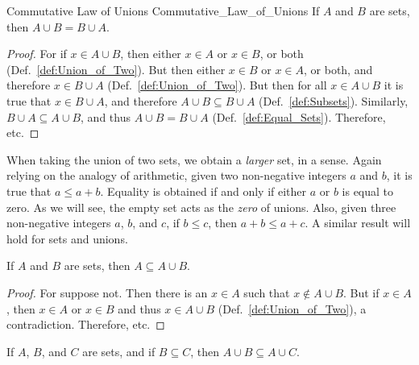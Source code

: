 \documentclass[crop=false,class=book,oneside]{standalone}
\begin{document}
            \begin{ltheorem}{Commutative Law of Unions}
                  {Commutative_Law_of_Unions}
                If $A$ and $B$ are sets, then
                $A\cup{B}=B\cup{A}$.
            \end{ltheorem}
            \begin{proof}
                For if $x\in{A}\cup{B}$, then either $x\in{A}$
                or $x\in{B}$, or both
                (Def.~\ref{def:Union_of_Two}). But then either
                $x\in{B}$ or $x\in{A}$, or both, and therefore
                $x\in{B}\cup{A}$ (Def.~\ref{def:Union_of_Two}).
                But then for all $x\in{A}\cup{B}$ it is true that
                $x\in{B}\cup{A}$, and therefore
                $A\cup{B}\subseteq{B}\cup{A}$
                (Def.~\ref{def:Subsets}). Similarly,
                $B\cup{A}\subseteq{A}\cup{B}$, and thus
                $A\cup{B}=B\cup{A}$ (Def.~\ref{def:Equal_Sets}).
                Therefore, etc.
            \end{proof}
            When taking the union of two sets, we obtain a
            \textit{larger} set, in a sense. Again relying on
            the analogy of arithmetic, given two non-negative
            integers $a$ and $b$, it is true that $a\leq{a}+b$.
            Equality is obtained if and only if either $a$ or
            $b$ is equal to zero. As we will see, the empty set
            acts as the \textit{zero} of unions. Also, given
            three non-negative integers $a$, $b$, and $c$, if
            $b\leq{c}$, then $a+b\leq{a}+c$. A similar result
            will hold for sets and unions.
            \begin{theorem}
                \label{thm:Union_is_Bigger}%
                If $A$ and $B$ are sets, then
                $A\subseteq{A}\cup{B}$.
            \end{theorem}
            \begin{proof}
                For suppose not. Then there is an $x\in{A}$ such
                that $x\notin{A}\cup{B}$. But if $x\in{A}$, then
                $x\in{A}$ or $x\in{B}$ and thus $x\in{A}\cup{B}$
                (Def.~\ref{def:Union_of_Two}), a
                contradiction. Therefore, etc.
            \end{proof}
            \newpage
            \begin{theorem}
                \label{thm:Union_With_Lesser_Set}%
                If $A$, $B$, and $C$ are sets, and if
                $B\subseteq{C}$, then
                $A\cup{B}\subseteq{A}\cup{C}$.
            \end{theorem}
\end{document}
